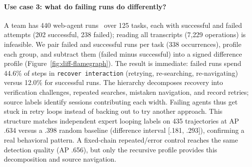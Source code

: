 \documentclass[sigconf,nonacm]{acmart}
\begin{document}
\paragraph{Use case 3: what do failing runs do differently?}
A team has 440 web-agent runs~\cite{agentrewardbench} over 125 tasks, each with successful and failed attempts (202 successful, 238 failed); reading all transcripts (7{,}229 operations) is infeasible.
We pair failed and successful runs per task (338 occurrences), profile each group, and subtract them (failed minus successful) into a signed difference profile (Figure~\ref{fig:diff-flamegraph}). The result is immediate: failed runs spend 44.6\% of steps in \texttt{recover interaction} (retrying, re-searching, re-navigating) versus 12.0\% for successful runs.
The hierarchy decomposes recovery into verification challenges, repeated searches, mistaken navigation, and record retries; source labels identify sessions contributing each width.
Failing agents thus get stuck in retry loops instead of backing out to try another approach.
This structure matches independent expert looping labels on 435 trajectories at AP .634 versus a .398 random baseline (difference interval [.181, .293]), confirming a real behavioral pattern. A fixed-chain repeated/error control reaches the same detection quality (AP .656), but only the recursive profile provides this decomposition and source navigation.
\end{document}
